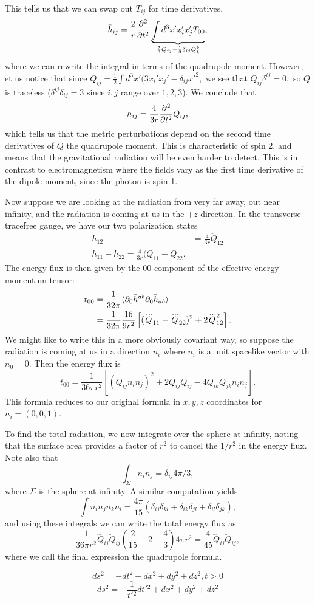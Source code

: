 This tells us that we can swap out $T_{ij}$ for time derivatives,
$$\bar h_{ij}=\frac{2}{r} \frac{\partial^2}{\partial t^2}\underbrace{\int d^3x' x_i' x_j' T_{00}}_{\frac{2}{3}Q_{ij}-\frac{1}{3}\delta_{ij} Q^k_k},$$
where we can rewrite the integral in terms of the quadrupole moment. However, et us notice that since $Q_{ij}=\frac{1}{2}\int d^3 x'(3x_i' x_j' -\delta_{ij} x'^2,$ we see that $Q_{ij}\delta^{ij}=0,$ so $Q$ is traceless ($\delta^{ij}\delta_{ij}=3$ since $i,j$ range over $1,2,3$). We conclude that
$$\bar h_{ij}=\frac{4}{3r}\frac{\partial^2}{\partial t^2} Q_{ij},$$
which tells us that the metric perturbations depend on the second time derivatives of $Q$ the quadrupole moment. This is characteristic of spin 2, and means that the gravitational radiation will be even harder to detect. This is in contrast to electromagnetism where the fields vary as the first time derivative of the dipole moment, since the photon is spin 1.

Now suppose we are looking at the radiation from very far away, out near infinity, and the radiation is coming at us in the $+z$ direction. In the transverse tracefree gauge, we have our two polarization states
\begin{align*}
    h_{12}&=\frac{4}{3r}\ddot Q_{12}\\
    h_{11}-h_{22}=\frac{4}{3r}(\ddot Q_{11}-\ddot Q_{22}.
\end{align*}
The energy flux is then given by the $00$ component of the effective energy-momentum tensor:
\begin{align*}
    t_{00}&=\frac{1}{32\pi}\langle\partial_0 \bar h^{ab} \partial_0 \bar h_{ab}\rangle\\
    &=\frac{1}{32\pi}\frac{16}{9r^2}\left[(\dddot Q_{11}-\dddot Q_{22})^2+2\dddot Q_{12}^2\right].
\end{align*}
We might like to write this in a more obviously covariant way, so suppose the radiation is coming at us in a direction $n_i$ where $n_i$ is a unit spacelike vector with $n_0=0$. Then the energy flux is
$$t_{00}=\frac{1}{36 \pi r^2}\left[(\dddot Q_{ij} n_i n_j)^2+2 \dddot Q_{ij} \dddot Q_{ij} -4\dddot Q_{ik} \dddot Q_{jk} n_i n_j\right].$$
This formula reduces to our original formula in $x,y,z$ coordinates for $n_i=(0,0,1)$.

To find the total radiation, we now integrate over the sphere at infinity, noting that the surface area provides a factor of $r^2$ to cancel the $1/r^2$ in the energy flux. Note also that $$\int_\Sigma n_i n_j = \delta_{ij}4\pi/3,$$ where $\Sigma$ is the sphere at infinity. A similar computation yields
$$\int n_i n_j n_k n_l = \frac{4\pi}{15}(\delta_{ij}\delta_{kl}+\delta_{ik} \delta_{jl}+\delta_{il}\delta_{jk}),$$
and using these integrals we can write the total energy flux as
$$\frac{1}{36\pi r^2}\dddot Q_{ij} \dddot Q_{ij}\left(\frac{2}{15}+2-\frac{4}{3}\right)4\pi r^2 =\frac{4}{45}\dddot Q_{ij}\dddot Q_{ij},$$
where we call the final expression the quadrupole formula. 

$$ds^2=-dt^2+dx^2+dy^2+dz^2, t>0$$
$$ds^2=-\frac{1}{t'{}^2}dt'{}^2+dx^2+dy^2+dz^2$$